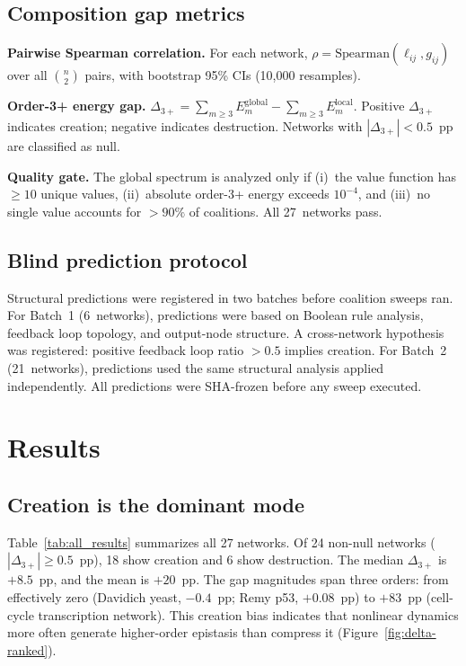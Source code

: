 \documentclass[10pt]{article}
\begin{document}
\subsection{Composition gap metrics}
\label{sec:metrics}

\textbf{Pairwise Spearman correlation.}
For each network, $\rho = \mathrm{Spearman}(\ell_{ij}, g_{ij})$ over
all $\binom{n}{2}$ pairs, with bootstrap 95\% CIs (10{,}000
resamples).

\textbf{Order-3+ energy gap.}
$\Delta_{3+} = \sum_{m \geq 3} E_m^{\mathrm{global}}
- \sum_{m \geq 3} E_m^{\mathrm{local}}.$
Positive $\Delta_{3+}$ indicates creation; negative indicates
destruction. Networks with $|\Delta_{3+}| < 0.5$~pp are classified as
null.

\textbf{Quality gate.}
The global spectrum is analyzed only if (i)~the value function has
$\geq 10$ unique values, (ii)~absolute order-3+ energy exceeds
$10^{-4}$, and (iii)~no single value accounts for $> 90\%$ of
coalitions. All 27~networks pass.


\subsection{Blind prediction protocol}
\label{sec:blind}

Structural predictions were registered in two batches before coalition
sweeps ran. For Batch~1 (6~networks), predictions were based on
Boolean rule analysis, feedback loop topology, and output-node
structure. A cross-network hypothesis was registered: positive
feedback loop ratio $> 0.5$ implies creation. For Batch~2
(21~networks), predictions used the same structural analysis applied
independently. All predictions were SHA-frozen before any sweep
executed.


\section{Results}
\label{sec:results}

\subsection{Creation is the dominant mode}

Table~\ref{tab:all_results} summarizes all 27 networks. Of 24
non-null networks ($|\Delta_{3+}| \geq 0.5$~pp), 18 show creation
and 6 show destruction. The median $\Delta_{3+}$ is $+8.5$~pp, and
the mean is $+20$~pp. The gap magnitudes span three orders: from
effectively zero (Davidich yeast, $-0.4$~pp; Remy p53, $+0.08$~pp)
to $+83$~pp (cell-cycle transcription network). This creation bias
indicates that nonlinear dynamics more often generate higher-order
epistasis than compress it (Figure~\ref{fig:delta-ranked}).
\end{document}
